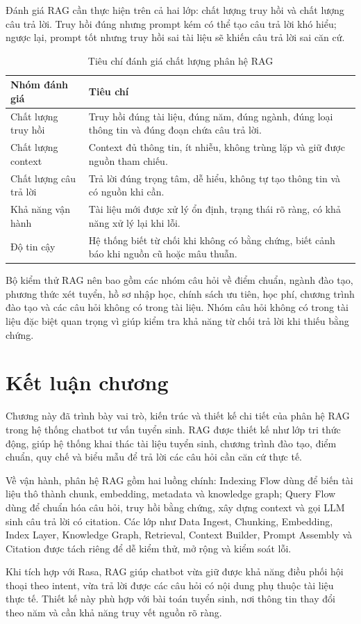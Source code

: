 Đánh giá RAG cần thực hiện trên cả hai lớp: chất lượng truy hồi và chất lượng câu trả lời. Truy hồi đúng nhưng prompt kém có thể tạo câu trả lời khó hiểu; ngược lại, prompt tốt nhưng truy hồi sai tài liệu sẽ khiến câu trả lời sai căn cứ.

\begin{table}[H]
\centering
\begin{tabular}{|p{4cm}|p{8.8cm}|}
\hline
\textbf{Nhóm đánh giá} & \textbf{Tiêu chí} \\
\hline
Chất lượng truy hồi & Truy hồi đúng tài liệu, đúng năm, đúng ngành, đúng loại thông tin và đúng đoạn chứa câu trả lời. \\
\hline
Chất lượng context & Context đủ thông tin, ít nhiễu, không trùng lặp và giữ được nguồn tham chiếu. \\
\hline
Chất lượng câu trả lời & Trả lời đúng trọng tâm, dễ hiểu, không tự tạo thông tin và có nguồn khi cần. \\
\hline
Khả năng vận hành & Tài liệu mới được xử lý ổn định, trạng thái rõ ràng, có khả năng xử lý lại khi lỗi. \\
\hline
Độ tin cậy & Hệ thống biết từ chối khi không có bằng chứng, biết cảnh báo khi nguồn cũ hoặc mâu thuẫn. \\
\hline
\end{tabular}
\caption{Tiêu chí đánh giá chất lượng phân hệ RAG}
\label{tab:rag-evaluation-criteria}
\end{table}

Bộ kiểm thử RAG nên bao gồm các nhóm câu hỏi về điểm chuẩn, ngành đào tạo, phương thức xét tuyển, hồ sơ nhập học, chính sách ưu tiên, học phí, chương trình đào tạo và các câu hỏi không có trong tài liệu. Nhóm câu hỏi không có trong tài liệu đặc biệt quan trọng vì giúp kiểm tra khả năng từ chối trả lời khi thiếu bằng chứng.

\section{Kết luận chương}

Chương này đã trình bày vai trò, kiến trúc và thiết kế chi tiết của phân hệ RAG trong hệ thống chatbot tư vấn tuyển sinh. RAG được thiết kế như lớp tri thức động, giúp hệ thống khai thác tài liệu tuyển sinh, chương trình đào tạo, điểm chuẩn, quy chế và biểu mẫu để trả lời các câu hỏi cần căn cứ thực tế.

Về vận hành, phân hệ RAG gồm hai luồng chính: Indexing Flow dùng để biến tài liệu thô thành chunk, embedding, metadata và knowledge graph; Query Flow dùng để chuẩn hóa câu hỏi, truy hồi bằng chứng, xây dựng context và gọi LLM sinh câu trả lời có citation. Các lớp như Data Ingest, Chunking, Embedding, Index Layer, Knowledge Graph, Retrieval, Context Builder, Prompt Assembly và Citation được tách riêng để dễ kiểm thử, mở rộng và kiểm soát lỗi.

Khi tích hợp với Rasa, RAG giúp chatbot vừa giữ được khả năng điều phối hội thoại theo intent, vừa trả lời được các câu hỏi có nội dung phụ thuộc tài liệu thực tế. Thiết kế này phù hợp với bài toán tuyển sinh, nơi thông tin thay đổi theo năm và cần khả năng truy vết nguồn rõ ràng.
